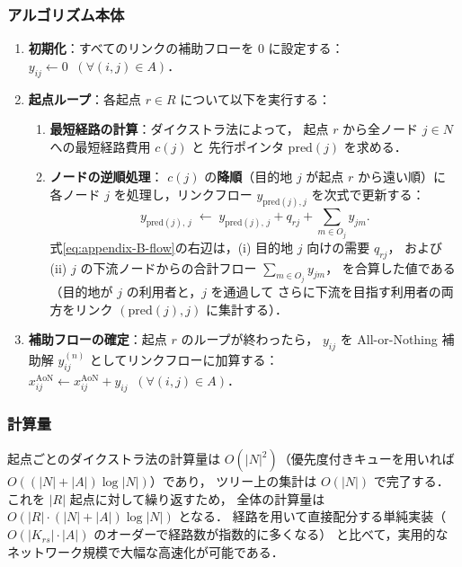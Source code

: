 \subsubsection*{アルゴリズム本体}

\begin{enumerate}
  \item \textbf{初期化}：すべてのリンクの補助フローを 0 に設定する：
        $y_{ij} \leftarrow 0 \;\; (\forall (i,j) \in A)$．
  \item \textbf{起点ループ}：各起点 $r \in R$ について以下を実行する：
    \begin{enumerate}
      \item \textbf{最短経路の計算}：ダイクストラ法によって，
            起点 $r$ から全ノード $j \in N$ への最短経路費用 $c(j)$ と
            先行ポインタ $\mathrm{pred}(j)$ を求める．
      \item \textbf{ノードの逆順処理}：
            $c(j)$ の\textbf{降順}（目的地 $j$ が起点 $r$ から遠い順）に
            各ノード $j$ を処理し，リンクフロー $y_{\mathrm{pred}(j), j}$ を次式で更新する：
            \begin{equation}
              y_{\mathrm{pred}(j),\, j}
              \;\leftarrow\;
              y_{\mathrm{pred}(j),\, j}
              + q_{rj}
              + \sum_{m \in O_j} y_{j m}.
              \label{eq:appendix-B-flow}
            \end{equation}
            式\eqref{eq:appendix-B-flow}の右辺は，(i) 目的地 $j$ 向けの需要 $q_{rj}$，
            および (ii) $j$ の下流ノードからの合計フロー $\sum_{m \in O_j} y_{jm}$，
            を合算した値である（目的地が $j$ の利用者と，$j$ を通過して
            さらに下流を目指す利用者の両方をリンク $(\mathrm{pred}(j), j)$ に集計する）．
    \end{enumerate}
  \item \textbf{補助フローの確定}：起点 $r$ のループが終わったら，
        $y_{ij}$ を All-or-Nothing 補助解 $y_{ij}^{(n)}$ としてリンクフローに加算する：
        $x_{ij}^{\text{AoN}} \leftarrow x_{ij}^{\text{AoN}} + y_{ij} \;\; (\forall (i,j) \in A)$．
\end{enumerate}

\subsubsection*{計算量}

起点ごとのダイクストラ法の計算量は $O(|N|^2)$（優先度付きキューを用いれば $O((|N|+|A|)\log|N|)$）であり，
ツリー上の集計は $O(|N|)$ で完了する．これを $|R|$ 起点に対して繰り返すため，
全体の計算量は $O(|R| \cdot (|N|+|A|)\log|N|)$ となる．
経路を用いて直接配分する単純実装（$O(|K_{rs}| \cdot |A|)$ のオーダーで経路数が指数的に多くなる）
と比べて，実用的なネットワーク規模で大幅な高速化が可能である．


